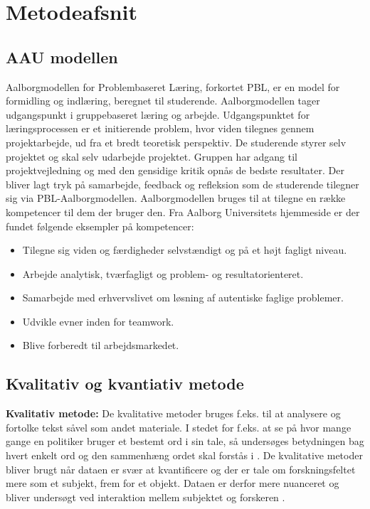 \chapter{Metodeafsnit}
\section{AAU modellen}
Aalborgmodellen for Problembaseret Læring, forkortet PBL, er en model for formidling og indlæring, beregnet til studerende. Aalborgmodellen tager udgangspunkt i gruppebaseret læring og arbejde. Udgangspunktet for læringsprocessen er et initierende problem, hvor viden tilegnes gennem projektarbejde, ud fra et bredt teoretisk perspektiv. De studerende styrer selv projektet og skal selv udarbejde projektet. Gruppen har adgang til projektvejledning og med den gensidige kritik opnås de bedste resultater. Der bliver lagt tryk på samarbejde, feedback og refleksion som de studerende tilegner sig via PBL-Aalborgmodellen.
Aalborgmodellen bruges til at tilegne en række kompetencer til dem der bruger den. Fra Aalborg Universitets hjemmeside er der fundet følgende eksempler på kompetencer:
\begin{itemize}
\item {Tilegne sig viden og færdigheder selvstændigt og på et højt fagligt niveau.}
\item {Arbejde analytisk, tværfagligt og problem- og resultatorienteret.}
\item {Samarbejde med erhvervslivet om løsning af autentiske faglige problemer.}
\item {Udvikle evner inden for teamwork.}
\item {Blive forberedt til arbejdsmarkedet.}
\end{itemize}
\citep{Universitet2015}\citep{Universitet2011}

\section{Kvalitativ og kvantiativ metode}
\textbf{Kvalitativ metode:}
De kvalitative metoder bruges f.eks. til at analysere og fortolke tekst såvel som andet materiale. I stedet for f.eks. at se på hvor mange gange en politiker bruger et bestemt ord i sin tale, så undersøges betydningen bag hvert enkelt ord og den sammenhæng ordet skal forstås i \citep{Gymportalen}. De kvalitative metoder bliver brugt når dataen er svær at kvantificere og der er tale om forskningsfeltet mere som et subjekt, frem for et objekt. Dataen er derfor mere nuanceret og bliver undersøgt ved interaktion mellem subjektet og forskeren \citep{Kval}.\\ 


